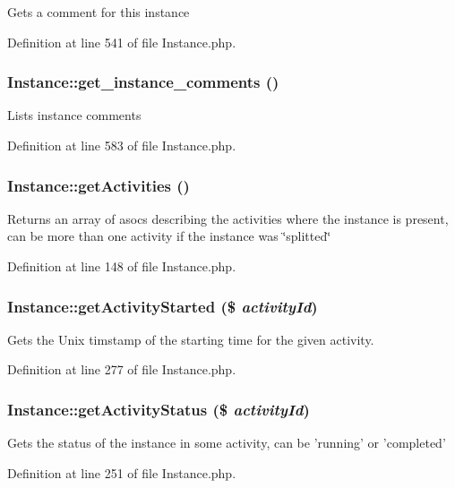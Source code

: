 Gets a comment for this instance 

Definition at line 541 of file Instance.php.
\subsubsection{\setlength{\rightskip}{0pt plus 5cm}Instance::get\_\-instance\_\-comments ()}\label{classInstance_a29}


Lists instance comments 

Definition at line 583 of file Instance.php.
\subsubsection{\setlength{\rightskip}{0pt plus 5cm}Instance::get\-Activities ()}\label{classInstance_a6}


Returns an array of asocs describing the activities where the instance is present, can be more than one activity if the instance was \char`\"{}splitted\char`\"{} 

Definition at line 148 of file Instance.php.
\subsubsection{\setlength{\rightskip}{0pt plus 5cm}Instance::get\-Activity\-Started (\$ {\em activity\-Id})}\label{classInstance_a18}


Gets the Unix timstamp of the starting time for the given activity. 

Definition at line 277 of file Instance.php.
\subsubsection{\setlength{\rightskip}{0pt plus 5cm}Instance::get\-Activity\-Status (\$ {\em activity\-Id})}\label{classInstance_a16}


Gets the status of the instance in some activity, can be 'running' or 'completed' 

Definition at line 251 of file Instance.php.
